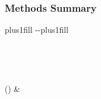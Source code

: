 \documentclass[letterpaper,10pt,english]{sphinxmanual}
\begin{document}
\begin{fulllineitems}
\begin{savenotes}
\begin{tabulary}{\linewidth}[t]{}
\\
\sphinxbottomrule
\end{tabulary}
\sphinxtableafterendhook\par
\sphinxattableend\end{savenotes}
\subsubsection*{Methods Summary}


\begin{savenotes}
\sphinxatlongtablestart
\sphinxthistablewithglobalstyle
\sphinxthistablewithnovlinesstyle
\makeatletter
  \LTleft \@totalleftmargin plus1fill
  \LTright\dimexpr\columnwidth-\@totalleftmargin-\linewidth\relax plus1fill
\makeatother
\begin{longtable}{}
\sphinxtoprule
\endfirsthead

\\
\sphinxtoprule
\endhead

\sphinxbottomrule
{}\\
\endfoot

\endlastfoot
\sphinxtableatstartofbodyhook

\sphinxAtStartPar
{}()
&
\sphinxAtStartPar


\end{longtable}
\end{savenotes}
\end{fulllineitems}
\end{document}
